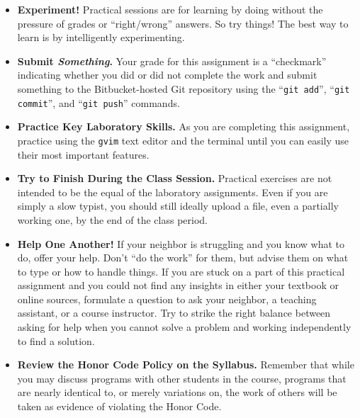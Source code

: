 \vspace*{-.05in}
\begin{itemize}

\itemsep 0in

\item {\bf Experiment!} Practical sessions are for learning by doing without the pressure of grades or ``right/wrong''
  answers. So try things!  The best way to learn is by intelligently experimenting.

\item {\bf Submit \textbf{\textit{Something}}.} Your grade for this assignment is a ``checkmark'' indicating whether you
  did or did not complete the work and submit something to the Bitbucket-hosted Git repository using the ``{\tt git
  add}'', ``{\tt git commit}'', and ``{\tt git push}'' commands.

\item {\bf Practice Key Laboratory Skills.} As you are completing this assignment, practice using the {\tt gvim} text
  editor and the terminal until you can easily use their most important features.

\item {\bf Try to Finish During the Class Session.} Practical exercises are not intended to be the equal of the
  laboratory assignments. Even if you are simply a slow typist, you should still ideally upload a file, even a partially
  working one, by the end of the class period.

\item {\bf Help One Another!} If your neighbor is struggling and you know what to do, offer your help. Don't ``do the
  work'' for them, but advise them on what to type or how to handle things. If you are stuck on a part of this practical
  assignment and you could not find any insights in either your textbook or online sources, formulate a question to ask
  your neighbor, a teaching assistant, or a course instructor. Try to strike the right balance between asking for help
  when you cannot solve a problem and working independently to find a solution.

\item {\bf Review the Honor Code Policy on the Syllabus.} Remember that while you may discuss programs with other
  students in the course, programs that are nearly identical to, or merely variations on, the work of others will be
  taken as evidence of violating the Honor Code.

\end{itemize}


